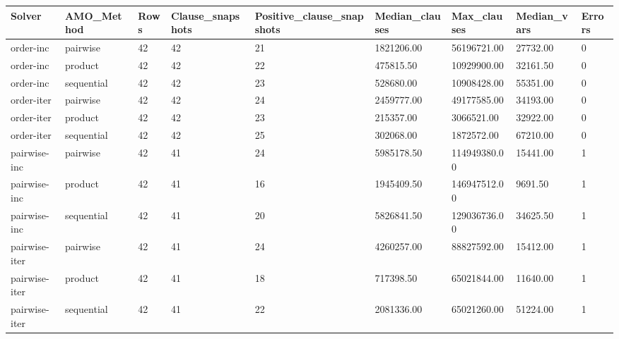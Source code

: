 \begin{tabular}{lllllllll}
\hline
Solver & AMO\_Method & Rows & Clause\_snapshots & Positive\_clause\_snapshots & Median\_clauses & Max\_clauses & Median\_vars & Errors \\
\hline
order-inc & pairwise & 42 & 42 & 21 & 1821206.00 & 56196721.00 & 27732.00 & 0 \\
order-inc & product & 42 & 42 & 22 & 475815.50 & 10929900.00 & 32161.50 & 0 \\
order-inc & sequential & 42 & 42 & 23 & 528680.00 & 10908428.00 & 55351.00 & 0 \\
order-iter & pairwise & 42 & 42 & 24 & 2459777.00 & 49177585.00 & 34193.00 & 0 \\
order-iter & product & 42 & 42 & 23 & 215357.00 & 3066521.00 & 32922.00 & 0 \\
order-iter & sequential & 42 & 42 & 25 & 302068.00 & 1872572.00 & 67210.00 & 0 \\
pairwise-inc & pairwise & 42 & 41 & 24 & 5985178.50 & 114949380.00 & 15441.00 & 1 \\
pairwise-inc & product & 42 & 41 & 16 & 1945409.50 & 146947512.00 & 9691.50 & 1 \\
pairwise-inc & sequential & 42 & 41 & 20 & 5826841.50 & 129036736.00 & 34625.50 & 1 \\
pairwise-iter & pairwise & 42 & 41 & 24 & 4260257.00 & 88827592.00 & 15412.00 & 1 \\
pairwise-iter & product & 42 & 41 & 18 & 717398.50 & 65021844.00 & 11640.00 & 1 \\
pairwise-iter & sequential & 42 & 41 & 22 & 2081336.00 & 65021260.00 & 51224.00 & 1 \\
\hline
\end{tabular}
